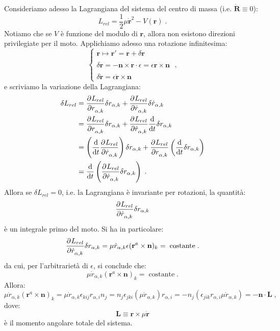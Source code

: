 Consideriamo adesso la Lagrangiana del sistema del centro di massa (i.e. $\dot{\mathbf{R}}\equiv0$):
\begin{equation}
L_{rel}=\frac{1}{2}\mu\dot{\mathbf{r}}^2-V(\mathbf{r})\;.
\end{equation}
Notiamo che se $V$ è funzione del modulo di $\mathbf{r}$, allora non esistono direzioni privilegiate per il moto. Applichiamo adesso una rotazione infinitesima:
\begin{equation}
\begin{cases}
\mathbf{r}\longmapsto\mathbf{r}'=\mathbf{r}+\delta\mathbf{r} \\
\\
\delta\mathbf{r}=-\mathbf{n}\times\mathbf{r}\cdot\epsilon=\epsilon\mathbf{r}\times\mathbf{n} \\
\\
\delta\dot{\mathbf{r}}=\epsilon\dot{\mathbf{r}}\times\mathbf{n}
\end{cases}\;,
\end{equation}
e scriviamo la variazione della Lagrangiana:
\begin{align}
\delta L_{rel} &=\frac{\partial^{}L_{rel}}{\partial r_{\alpha,k}^{}}\delta r_{\alpha,k}+\frac{\partial^{}L_{rel}}{\partial \dot{r}_{\alpha,k}^{}}\delta\dot{r}_{\alpha,k} \notag \\
&=\frac{\partial^{}L_{rel}}{\partial r_{\alpha,k}^{}}\delta r_{\alpha,k}+\frac{\partial^{}L_{rel}}{\partial \dot{r}_{\alpha,k}^{}}\frac{\mathrm{d}}{\mathrm{d}{t}}\delta r_{\alpha,k} \notag \\
&=\left(\frac{\mathrm{d}}{\mathrm{d}{t}}\frac{\partial^{}L_{rel}}{\partial \dot{r}_{\alpha,k}^{}}\right)\delta r_{\alpha,k}+\frac{\partial^{}L_{rel}}{\partial r_{\alpha,k}^{}}\left(\frac{\mathrm{d}}{\mathrm{d}{t}}\delta r_{\alpha,k}\right) \notag \\
&= \frac{\mathrm{d}}{\mathrm{d}{t}}\left(\frac{\partial^{}L_{rel}}{\partial \dot{r}_{\alpha,k}^{}}\delta r_{\alpha,k}\right)\;.
\end{align}
Allora se $\delta L_{rel}=0$, i.e. la Lagrangiana è invariante per rotazioni, la quantità:
\begin{equation}
\frac{\partial^{}L_{rel}}{\partial \dot{r}_{\alpha,k}^{}}\delta r_{\alpha,k}
\end{equation}
è un integrale primo del moto. Si ha in particolare:
\begin{equation}
\frac{\partial^{}L_{rel}}{\partial \dot{r}_{\alpha,k}^{}}\delta r_{\alpha,k}=\mu\dot{r}_{\alpha,k}\epsilon(\mathbf{r}^a\times\mathbf{n})_k=\;\mbox{costante}\;.
\end{equation}
da cui, per l'arbitrarietà di $\epsilon$, si conclude che:
\begin{equation}
\mu\dot{r}_{\alpha,k}(\mathbf{r}^a\times\mathbf{n})_k=\;\mbox{costante}\;.
\end{equation}
Allora:
\begin{equation}
\mu\dot{r}_{\alpha,k}(\mathbf{r}^a\times\mathbf{n})_k=\mu\dot{r}_{\alpha,k}\epsilon_{kij}r_{\alpha,i} n_j=n_j\epsilon_{jki}(\mu\dot{r}_{\alpha,k})r_{\alpha,i}=-n_j(\epsilon_{jik}r_{\alpha,i} \mu\dot{r}_{\alpha,k})=-\mathbf{n}\cdot\mathbf{L}\;,
\end{equation}
dove:
\begin{equation}
\mathbf{L}\equiv \mathbf{r}\times\mu\dot{\mathbf{r}}
\end{equation}
è il momento angolare totale del sistema. \\

